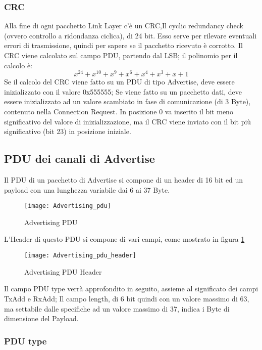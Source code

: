 \subsubsection{CRC}
Alla fine di ogni pacchetto Link Layer c'è un CRC,Il cyclic redundancy check (ovvero controllo a ridondanza ciclica), di 24 bit. Esso serve per rilevare eventuali errori di trasmissione, quindi per sapere se il pacchetto ricevuto è corrotto.
Il CRC viene calcolato sul campo PDU, partendo dal LSB; il polinomio per il calcolo è:
\[x^24 + x^10 + x^9 + x^6 + x^4 + x^3 + x + 1\] 
Se il calcolo del CRC viene fatto su un PDU di tipo Advertise, deve essere inizializzato con il valore 0x555555;
Se viene fatto su un pacchetto dati, deve essere inizializzato ad un valore scambiato in fase di comunicazione (di 3 Byte), contenuto nella Connection Request.
In posizione 0 va inserito il bit meno significativo del valore di inizializzazione, ma il CRC viene inviato con il bit più significativo (bit 23) in posizione iniziale.

\subsection{PDU dei canali di Advertise}\label{pdus}
Il PDU di un pacchetto di Advertise si compone di un header di 16 bit ed un payload con una lunghezza variabile dai 6 ai 37 Byte.

\begin{figure}[H]
\texttt{[image: Advertising\_pdu]}
\centering
\caption{Advertising PDU}
\end{figure}

\noindent L'Header di questo PDU si compone di vari campi, come mostrato in figura \ref{Advertising_pdu_header}

\begin{figure}[H]
\texttt{[image: Advertising\_pdu\_header]}
\centering
\caption{Advertising PDU Header}
\label{Advertising_pdu_header}
\end{figure}

Il campo PDU type verrà approfondito in seguito, assieme al significato dei campi TxAdd e RxAdd; Il campo length, di 6 bit quindi con un valore massimo di 63, ma settabile dalle specifiche ad un valore massimo di 37, indica i Byte di dimensione del Payload.


\subsubsection{PDU type}


